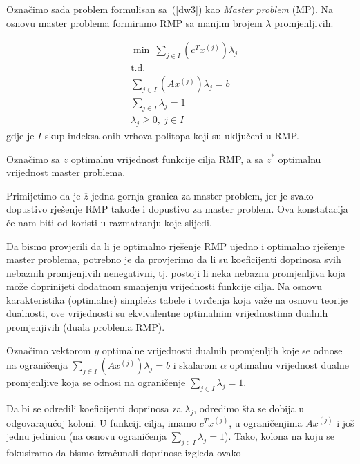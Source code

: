 \documentclass[a4paper, utf8, 11pt, colorlinks]{book}
\theoremstyle{definition}
\begin{document}
 Označimo sada problem formulisan  sa~(\ref{dw3}) kao \emph{Master problem} (MP). Na osnovu master problema formiramo RMP sa manjim brojem $\lambda$ promjenljivih.
 
     \begin{equation}
 	\begin{aligned}\label{dw4}
 		&\min\   \sum_{j\in I}(c^T x^{(j)})\lambda_j\\
 		&\mbox{t.d.}\\ 
 		 &\sum_{j\in I} (A x^{(j)})\lambda_j=b\\
 		&\sum_{j\in I}\lambda_j = 1\\
 		&\lambda_j\geqslant 0,\ j  \in I
 	\end{aligned}
 \end{equation}
gdje je $I$ skup indeksa onih vrhova politopa koji su uključeni u RMP.

Označimo sa $\overline{z}$ optimalnu vrijednost funkcije cilja RMP, a sa $z^*$ optimalnu vrijednost master problema.

Primijetimo da je $\overline{z}$ jedna gornja granica za master problem, jer je svako dopustivo rješenje RMP takođe i dopustivo za master problem. Ova konstatacija će nam biti od koristi u razmatranju koje slijedi.

Da bismo provjerili da li je optimalno rješenje RMP ujedno i optimalno rješenje master problema, potrebno je da provjerimo da li su koeficijenti doprinosa svih nebaznih promjenjivih nenegativni, tj. postoji li neka nebazna promjenljiva koja može doprinijeti dodatnom smanjenju vrijednosti funkcije cilja. Na osnovu karakteristika (optimalne) simpleks tabele i tvrđenja koja važe na osnovu teorije dualnosti, ove vrijednosti su ekvivalentne optimalnim vrijednostima dualnih promjenjivih (duala problema RMP).   



Označimo vektorom $y$ optimalne vrijednosti dualnih promjenljih koje se odnose na ograničenja $\sum_{j\in I} (A x^{(j)})\lambda_j=b$ i skalarom $\alpha$ optimalnu vrijednost dualne promjenljive koja se odnosi na ograničenje $\sum_{j\in I}\lambda_j = 1$. 

Da bi se odredili   koeficijenti doprinosa za $\lambda_j$, odredimo šta se dobija u odgovarajućoj koloni. U funkciji cilja, imamo $c^Tx^{(j)}$, u ograničenjima $A x^{(j)} $ i još jednu jedinicu (na osnovu ograničenja $\sum_{j\in I}\lambda_j = 1$). Tako, kolona na koju se fokusiramo da bismo izračunali doprinose izgleda ovako
\end{document}
